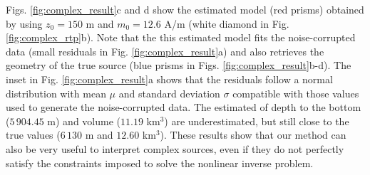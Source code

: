 Figs. \ref{fig:complex_result}c and d show the estimated model (red prisms) 
obtained by using $z_0 = 150$ m and $m_0 = 12.6 $ A/m 
(white diamond in Fig. \ref{fig:complex_rtp}b).
Note that the this estimated model fits the noise-corrupted data 
(small residuals in Fig. \ref{fig:complex_result}a) 
and also retrieves the geometry of the true source 
(blue prisms in Figs. \ref{fig:complex_result}b-d). 
The inset in Fig. \ref{fig:complex_result}a shows that the residuals follow a normal distribution with mean $ \mu $ and standard deviation $ \sigma $ compatible with those values used to generate the noise-corrupted data. 
The estimated of depth to the bottom ($ 5\,904.45 $ m) and volume ($ 11.19 $ km$^3 $) are underestimated, but still close to the true values ($ 6\,130 $ m and $ 12.60 $ km$^3 $). 
These results show that our method can also be very useful to interpret complex sources, even if they do not perfectly satisfy the constraints imposed to solve the nonlinear inverse problem.